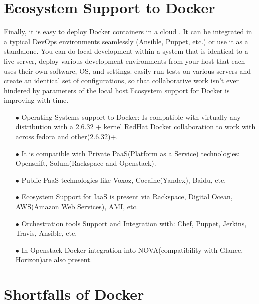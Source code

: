 \documentclass[9pt,twocolumn,twoside]{../../styles/osajnl}
\begin{document}
\section{Ecosystem Support to Docker}
Finally, it is easy to deploy Docker containers in a cloud
 \cite{www-docker-1}. It can be integrated in a typical DevOps
environments seamlessly (Ansible, Puppet, etc.) or use it as a
standalone. You can do local development within a system that is
identical to a live server, deploy various development environments
from your host that each uses their own software, OS, and settings.
easily run tests on various servers and create an identical set of
configurations, so that collaborative work isn’t ever hindered by
parameters of the local host.Ecosystem support for Docker is improving
with time.
\begin{itemize}
\item[$\bullet$]Operating Systems support to Docker: Is compatible
  with virtually any distribution with a 2.6.32 + kernel RedHat Docker
  collaboration to work with across fedora and other(2.6.32)+.

\item[$\bullet$]It is compatible with Private PaaS(Platform as a
  Service) technologies: Openshift, Solum(Rackspace and Openstack).

\item[$\bullet$]Public PaaS technologies like Voxoz,
   Cocaine(Yandex), Baidu, etc.

\item[$\bullet$]Ecosystem Support for IaaS is present via Rackspace,
  Digital Ocean, AWS(Amazon Web Services), AMI, etc.

\item[$\bullet$]Orchestration tools Support and Integration with:
  Chef, Puppet, Jerkins, Travis, Ansible, etc.

\item[$\bullet$]In Openstack Docker integration into
  NOVA(compatibility with Glance, Horizon)are also present.
\end{itemize}
\section{Shortfalls of Docker}
\end{document}
